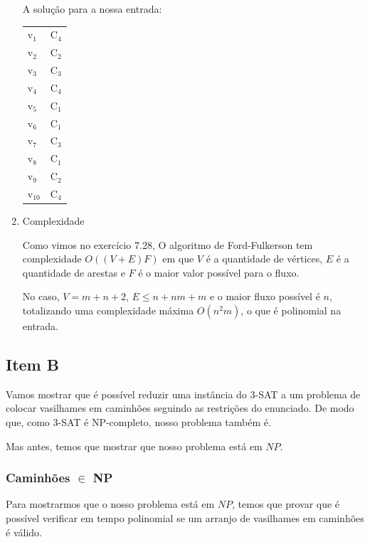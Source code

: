 \documentclass[11pt]{article}
\begin{document}
\begin{enumerate}
A solução para a nossa entrada:
\begin{center}
\begin{tabular}{ll}
v$_{\text{1}}$ & C$_{\text{4}}$\\
v$_{\text{2}}$ & C$_{\text{2}}$\\
v$_{\text{3}}$ & C$_{\text{3}}$\\
v$_{\text{4}}$ & C$_{\text{4}}$\\
v$_{\text{5}}$ & C$_{\text{1}}$\\
v$_{\text{6}}$ & C$_{\text{1}}$\\
v$_{\text{7}}$ & C$_{\text{3}}$\\
v$_{\text{8}}$ & C$_{\text{1}}$\\
v$_{\text{9}}$ & C$_{\text{2}}$\\
v$_{\text{10}}$ & C$_{\text{4}}$\\
\end{tabular}
\end{center}

\item Complexidade
\label{sec-6-2-1-2}

Como vimos no exercício 7.28, O algoritmo de Ford-Fulkerson tem
complexidade $O((V + E)F)$ em que $V$ é a quantidade de vértices, $E$
é a quantidade de arestas e $F$ é o maior valor possível para o fluxo.

No caso, $V = m + n + 2$, $E \leq n + nm + m$ e o maior fluxo possível é
$n$, totalizando uma complexidade máxima $O(n^2m)$, o que é polinomial na
entrada.
\end{enumerate}

\subsection{Item B}
\label{sec-6-3}

Vamos mostrar que é possível reduzir uma instância do 3-SAT a um
problema de colocar vasilhames em caminhões seguindo as restrições do
enunciado. De modo que, como 3-SAT é NP-completo, nosso problema
também é.

Mas antes, temos que mostrar que nosso problema está em $NP$.

\subsubsection{Caminhões $\in$ NP}
\label{sec-6-3-1}

Para mostrarmos que o nosso problema está em $NP$, temos que provar
que é possível verificar em tempo polinomial se um arranjo de
vasilhames em caminhões é válido.
\end{document}
